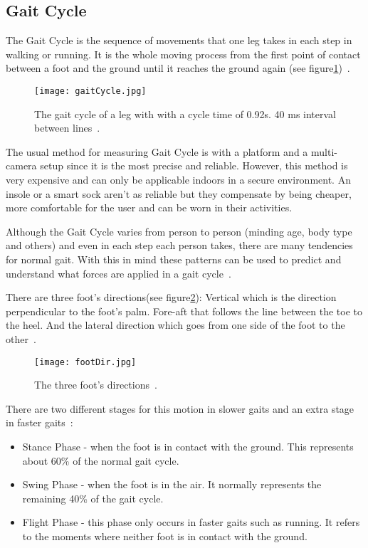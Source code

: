 \subsection{Gait Cycle}
\label{ssec:gait_cycle}

The Gait Cycle is the sequence of movements that one leg takes in each step in walking or running. It is the whole moving process from the first point of contact between 
a foot and the ground until it reaches the ground again (see figure\ref{fig:gaitCycle})~\cite{masterInsole, freewalker}.

\vspace{.5cm}
\begin{figure}[htbp]
    \centering
    \texttt{[image: gaitCycle.jpg]}
    \caption{The gait cycle of a leg with with a cycle time of 0.92s. 40 ms interval between lines~\cite{gaitBook}.}
    \label{fig:gaitCycle}
\end{figure}

The usual method for measuring Gait Cycle is with a platform and a multi-camera setup since it is the most precise and reliable. However, this method is very expensive and can only be 
applicable indoors in a secure environment. An insole or a smart sock aren't as reliable but they compensate by being cheaper, more comfortable for the user and can be worn in their activities.

Although the Gait Cycle varies from person to person (minding age, body type and others) and even in each step each person takes, there are many tendencies for normal gait.
With this in mind these patterns can be used to predict and understand what forces are applied in a gait cycle~\cite{masterInsole}.

There are three foot's directions(see figure\ref{fig:footDir}): Vertical which is the direction perpendicular to the foot's palm. Fore-aft that follows the line between the toe to the heel. And the 
lateral direction which goes from one side of the foot to the other~\cite{masterInsole}.

\begin{figure}[htbp]
  \centering
  \texttt{[image: footDir.jpg]}
  \caption{The three foot's directions~\cite{gaitBook}.}
  \label{fig:footDir}
\end{figure}


There are two different stages for this motion in slower gaits and an extra stage in faster gaits~\cite{porto}:

\begin{itemize}
  \item Stance Phase - when the foot is in contact with the ground. This represents about 60\% of the normal gait cycle.
  \item Swing Phase - when the foot is in the air. It normally represents the remaining 40\% of the gait cycle.
  \item Flight Phase - this phase only occurs in faster gaits such as running. It refers to the moments where neither foot is in contact with the ground.
\end{itemize}


